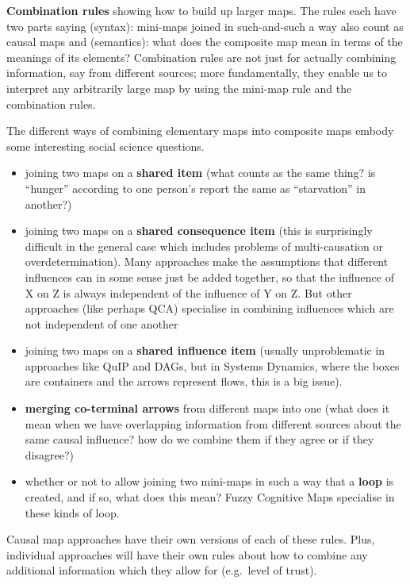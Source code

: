 \documentclass[
]{book}
\providecommand{\tightlist}{%
  \setlength{\itemsep}{0pt}\setlength{\parskip}{0pt}}
\begin{document}
\textbf{Combination rules} showing how to build up larger maps. The rules each have two parts saying (syntax): mini-maps joined in such-and-such a way also count as causal maps and (semantics): what does the composite map mean in terms of the meanings of its elements? Combination rules are not just for actually combining information, say from different sources; more fundamentally, they enable us to interpret any arbitrarily large map by using the mini-map rule and the combination rules.

The different ways of combining elementary maps into composite maps embody some interesting social science questions.

\begin{itemize}
\tightlist
\item
  joining two maps on a \textbf{shared item} (what counts as the same thing? is ``hunger'' according to one person's report the same as ``starvation'' in another?)
\item
  joining two maps on a \textbf{shared consequence item} (this is surprisingly difficult in the general case which includes problems of multi-causation or overdetermination). Many approaches make the assumptions that different influences can in some sense just be added together, so that the influence of X on Z is always independent of the influence of Y on Z. But other approaches (like perhaps QCA) specialise in combining influences which are not independent of one another
\item
  joining two maps on a \textbf{shared influence item} (usually unproblematic in approaches like QuIP and DAGs, but in Systems Dynamics, where the boxes are containers and the arrows represent flows, this is a big issue).
\item
  \textbf{merging co-terminal arrows} from different maps into one (what does it mean when we have overlapping information from different sources about the same causal influence? how do we combine them if they agree or if they disagree?)
\item
  whether or not to allow joining two mini-maps in such a way that a \textbf{loop} is created, and if so, what does this mean? Fuzzy Cognitive Maps specialise in these kinds of loop.
\end{itemize}

Causal map approaches have their own versions of each of these rules. Plus, individual approaches will have their own rules about how to combine any additional information which they allow for (e.g.~level of trust).
\end{document}
